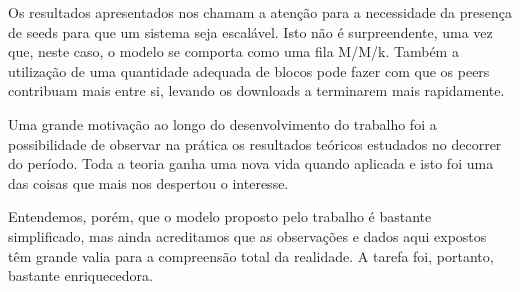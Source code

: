 \documentclass[a4paper,10pt]{article}
\begin{document}
Os resultados apresentados nos chamam a atenção para a necessidade da presença de seeds para que um sistema seja escalável. Isto não é surpreendente, uma vez que, neste caso, o modelo se comporta como uma fila M/M/k. Também a utilização de uma quantidade adequada de blocos pode fazer com que os peers contribuam mais entre si, levando os downloads a terminarem mais rapidamente.

Uma grande motivação ao longo do desenvolvimento do trabalho foi a possibilidade de observar na prática os resultados teóricos estudados no decorrer do período. Toda a teoria ganha uma nova vida quando aplicada e isto foi uma das coisas que mais nos despertou o interesse.

Entendemos, porém, que o modelo proposto pelo trabalho é bastante simplificado, mas ainda acreditamos que as observações e dados aqui expostos têm grande valia para a compreensão total da realidade. A tarefa foi, portanto, bastante enriquecedora.

\pagebreak
\end{document}
